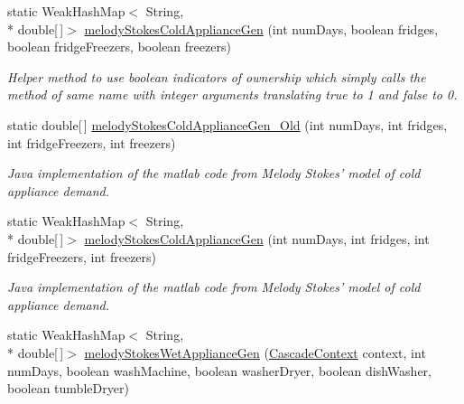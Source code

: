 \begin{DoxyCompactItemize}
\item 
static Weak\-Hash\-Map$<$ String, \\*
double\mbox{[}$\,$\mbox{]}$>$ \hyperlink{classuk_1_1ac_1_1dmu_1_1iesd_1_1cascade_1_1util_1_1_initial_profile_gen_utils_ad499b30b2ede94bbe1ebdc76b47c203e}{melody\-Stokes\-Cold\-Appliance\-Gen} (int num\-Days, boolean fridges, boolean fridge\-Freezers, boolean freezers)
\begin{DoxyCompactList}\small\item\em Helper method to use boolean indicators of ownership which simply calls the method of same name with integer arguments translating true to 1 and false to 0. \end{DoxyCompactList}\item 
static double\mbox{[}$\,$\mbox{]} \hyperlink{classuk_1_1ac_1_1dmu_1_1iesd_1_1cascade_1_1util_1_1_initial_profile_gen_utils_a0110d443f84940dde051667b8b638e5c}{melody\-Stokes\-Cold\-Appliance\-Gen\-\_\-\-Old} (int num\-Days, int fridges, int fridge\-Freezers, int freezers)
\begin{DoxyCompactList}\small\item\em Java implementation of the matlab code from Melody Stokes' model of cold appliance demand. \end{DoxyCompactList}\item 
static Weak\-Hash\-Map$<$ String, \\*
double\mbox{[}$\,$\mbox{]}$>$ \hyperlink{classuk_1_1ac_1_1dmu_1_1iesd_1_1cascade_1_1util_1_1_initial_profile_gen_utils_afde0080e90c188dc2b9074bf105cd423}{melody\-Stokes\-Cold\-Appliance\-Gen} (int num\-Days, int fridges, int fridge\-Freezers, int freezers)
\begin{DoxyCompactList}\small\item\em Java implementation of the matlab code from Melody Stokes' model of cold appliance demand. \end{DoxyCompactList}\item 
static Weak\-Hash\-Map$<$ String, \\*
double\mbox{[}$\,$\mbox{]}$>$ \hyperlink{classuk_1_1ac_1_1dmu_1_1iesd_1_1cascade_1_1util_1_1_initial_profile_gen_utils_a49cdaaf69ec071e90b2c49637148f72d}{melody\-Stokes\-Wet\-Appliance\-Gen} (\hyperlink{classuk_1_1ac_1_1dmu_1_1iesd_1_1cascade_1_1context_1_1_cascade_context}{Cascade\-Context} context, int num\-Days, boolean wash\-Machine, boolean washer\-Dryer, boolean dish\-Washer, boolean tumble\-Dryer)
\item 

\end{DoxyCompactItemize}
